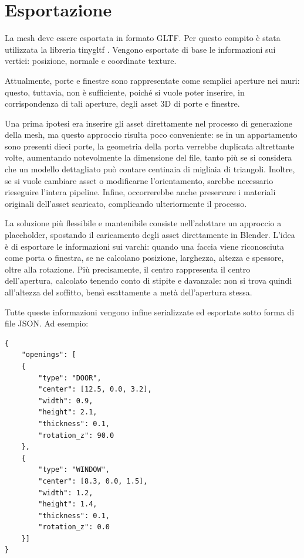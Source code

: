 \section{Esportazione}
\label{sec:esportazione}

La mesh deve essere esportata in formato GLTF. Per questo compito è stata utilizzata la libreria tinygltf \cite{tinygltf}. Vengono esportate di base le informazioni sui vertici: posizione, normale e coordinate texture.

Attualmente, porte e finestre sono rappresentate come semplici aperture nei muri: questo, tuttavia, non è sufficiente, poiché si vuole poter inserire, in corrispondenza di tali aperture, degli asset 3D di porte e finestre.

Una prima ipotesi era inserire gli asset direttamente nel processo di generazione della mesh, ma questo approccio risulta poco conveniente: se in un appartamento sono presenti dieci porte, la geometria della porta verrebbe duplicata altrettante volte, aumentando notevolmente la dimensione del file, tanto più se si considera che un modello dettagliato può contare centinaia di migliaia di triangoli. Inoltre, se si vuole cambiare asset o modificarne l'orientamento, sarebbe necessario rieseguire l'intera pipeline. Infine, occorrerebbe anche preservare i materiali originali dell'asset scaricato, complicando ulteriormente il processo.

La soluzione più flessibile e mantenibile consiste nell'adottare un approccio a placeholder, spostando il caricamento degli asset direttamente in Blender. L'idea è di esportare le informazioni sui varchi: quando una faccia viene riconosciuta come porta o finestra, se ne calcolano posizione, larghezza, altezza e spessore, oltre alla rotazione. Più precisamente, il centro rappresenta il centro dell'apertura, calcolato tenendo conto di stipite e davanzale: non si trova quindi all'altezza del soffitto, bensì esattamente a metà dell'apertura stessa.

Tutte queste informazioni vengono infine serializzate ed esportate sotto forma di file JSON. Ad esempio:
\begin{listing}[H]
\begin{verbatim}
{
	"openings": [
	{
		"type": "DOOR",
		"center": [12.5, 0.0, 3.2],
		"width": 0.9,
		"height": 2.1,
		"thickness": 0.1,
		"rotation_z": 90.0
	},
	{
		"type": "WINDOW",
		"center": [8.3, 0.0, 1.5],
		"width": 1.2,
		"height": 1.4,
		"thickness": 0.1,
		"rotation_z": 0.0
	}]
}
\end{verbatim}
\end{listing}
